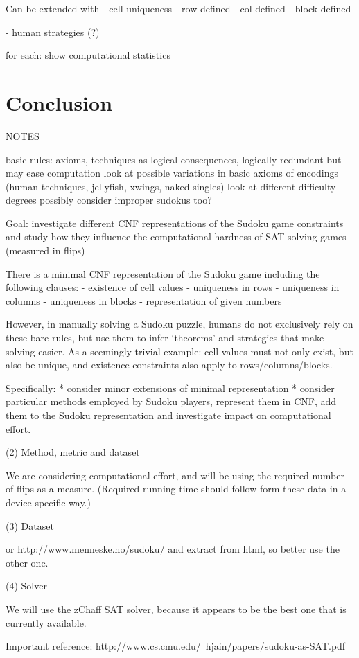 \documentclass[10pt,a4paper,leqno]{article}
\begin{document}

Can be extended with
- cell uniqueness
- row defined
- col defined
- block defined

- human strategies (?)

for each: show computational statistics 

\section*{Conclusion}








NOTES

basic rules: axioms, techniques as logical consequences, logically redundant but may ease computation
	look at possible variations in basic axioms of
encodings (human techniques, jellyfish, xwings, naked singles)
look at different difficulty degrees
possibly consider improper sudokus too?

Goal: investigate different CNF representations of the Sudoku game constraints and study how they influence the computational hardness of SAT solving games (measured in flips)

There is a minimal CNF representation of the Sudoku game including the following clauses:
- existence of cell values
- uniqueness in rows
- uniqueness in columns
- uniqueness in blocks
- representation of given numbers

However, in manually solving a Sudoku puzzle, humans do not exclusively rely on these bare rules, but use them to infer ‘theorems’ and strategies that make solving easier.  As a seemingly trivial example: cell values must not only exist, but also be unique, and existence constraints also apply to rows/columns/blocks.

Specifically: 
* consider minor extensions of minimal representation 
* consider particular methods employed by Sudoku players, represent them in CNF, add them to the Sudoku representation and investigate impact on computational effort. 

(2) Method, metric and dataset

We are considering computational effort, and will be using the required number of flips as a measure. (Required running time should follow form these data in a device-specific way.)

(3) Dataset


or
http://www.menneske.no/sudoku/
and extract from html, so better use the other one. 

(4) Solver

We will use the zChaff SAT solver, because it appears to be the best one that is currently available. 

Important reference:
http://www.cs.cmu.edu/~hjain/papers/sudoku-as-SAT.pdf
\end{document}
